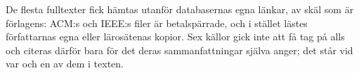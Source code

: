 De flesta fulltexter fick hämtas utanför databasernas egna länkar, av
skäl som är förlagens: ACM:s och IEEE:s filer är betalspärrade, och i
stället lästes författarnas egna eller lärosätenas kopior.  Sex källor
gick inte att få tag på alls och citeras därför bara för det deras
sammanfattningar själva anger; det står vid var och en av dem i texten.

